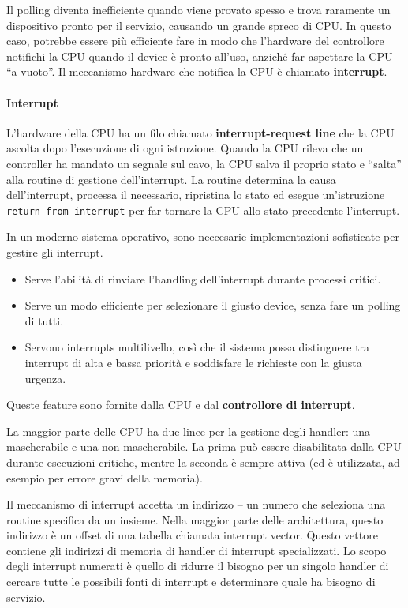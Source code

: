 \documentclass[a4paper]{article}
\begin{document}
Il polling diventa inefficiente quando viene provato spesso e trova raramente un dispositivo pronto per il servizio, causando un grande spreco di CPU. In questo caso, potrebbe essere più efficiente fare in modo che l'hardware del controllore notifichi la CPU quando il device è pronto all'uso, anziché far aspettare la CPU ``a vuoto''. Il meccanismo hardware che notifica la CPU è chiamato \textbf{interrupt}.

\paragraph{Interrupt}
L'hardware della CPU ha un filo chiamato \textbf{interrupt-request line} che la CPU ascolta dopo l'esecuzione di ogni istruzione. Quando la CPU rileva che un controller ha mandato un segnale sul cavo, la CPU salva il proprio stato e ``salta'' alla routine di gestione dell'interrupt. La routine determina la causa dell'interrupt, processa il necessario, ripristina lo stato ed esegue un'istruzione \texttt{return from interrupt} per far tornare la CPU allo stato precedente l'interrupt.

In un moderno sistema operativo, sono neccesarie implementazioni sofisticate per gestire gli interrupt.
\begin{itemize}
   \item Serve l'abilità di rinviare l'handling dell'interrupt durante processi critici.
   \item Serve un modo efficiente per selezionare il giusto device, senza fare un polling di tutti.
   \item Servono interrupts multilivello, così che il sistema possa distinguere tra interrupt di alta e bassa priorità e soddisfare le richieste con la giusta urgenza.
\end{itemize}

Queste feature sono fornite dalla CPU e dal \textbf{controllore di interrupt}.

La maggior parte delle CPU ha due linee per la gestione degli handler: una mascherabile e una non mascherabile. La prima può essere disabilitata dalla CPU durante esecuzioni critiche, mentre la seconda è sempre attiva (ed è utilizzata, ad esempio per errore gravi della memoria).

Il meccanismo di interrupt accetta un indirizzo -- un numero che seleziona una routine specifica da un insieme. Nella maggior parte delle architettura, questo indirizzo è un offset di una tabella chiamata interrupt vector. Questo vettore contiene gli indirizzi di memoria di handler di interrupt specializzati. Lo scopo degli interrupt numerati è quello di ridurre il bisogno per un singolo handler di cercare tutte le possibili fonti di interrupt e determinare quale ha bisogno di servizio.
\end{document}
